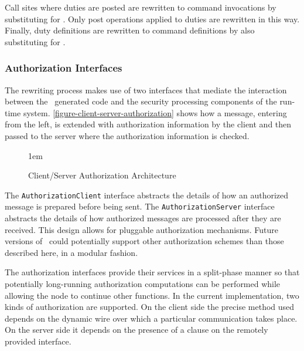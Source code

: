 
Call sites where duties are posted are rewritten to command invocations
by substituting  for . Only post operations
applied to duties are rewritten in this way. Finally, duty definitions
are rewritten to command definitions by also substituting 
for .

\subsubsection{Authorization Interfaces}

The rewriting process makes use of two interfaces that mediate the
interaction between the \Sprocket\ generated code and the security
processing components of the run-time system.
\autoref{figure-client-server-authorization} shows how a message,
entering from the left, is extended with authorization information by
the client and then passed to the server where the authorization
information is checked.

\begin{figure}[htbp]
  
  \centerline{\raise 1em\box\graph}
  \caption{Client/Server Authorization Architecture}
  \label{figure-client-server-authorization}
\end{figure}

The \texttt{AuthorizationClient} interface abstracts the details of how
an authorized message is prepared before being sent. The
\texttt{AuthorizationServer} interface abstracts the details of how
authorized messages are processed after they are received. This design
allows for pluggable authorization mechanisms. Future versions of
\Sprocket\ could potentially support other authorization schemes than
those described here, in a modular fashion.

The authorization interfaces provide their services in a split-phase
manner so that potentially long-running authorization computations can
be performed while allowing the node to continue other functions.  In
the current implementation, two kinds of authorization are supported.
On the client side the precise method used depends on the dynamic wire
over which a particular communication takes place. On the server side
it depends on the presence of a  clause on the remotely
provided interface.

